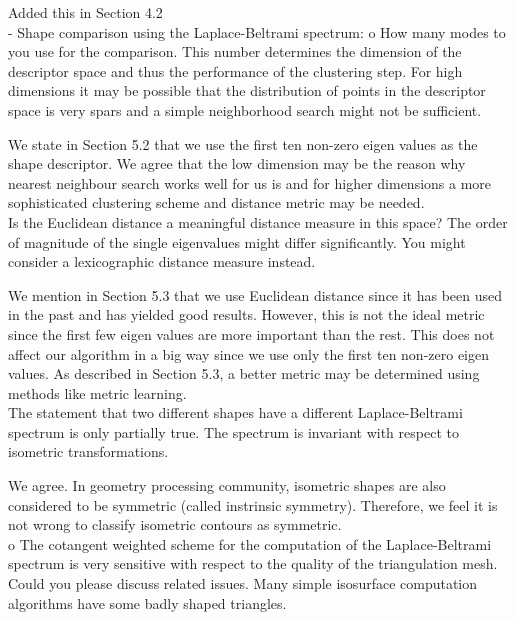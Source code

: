 \documentclass[10pt]{article}
\begin{document}
   {\color{blue}Added this in Section 4.2}\\

   - Shape comparison using the Laplace-Beltrami spectrum:
   o How many modes to you use for the comparison. This number determines
   the dimension of the descriptor space and thus the performance of the
   clustering step. For high dimensions it may be possible that the
   distribution of points in the descriptor space is very spars and a simple
   neighborhood search might not be sufficient. 

   {\color{blue}We state in Section 5.2 that we use the first ten non-zero eigen
	   values as the shape descriptor. We agree that the low dimension
	   may be the reason why
	   nearest neighbour search works well for us is 
	   and for higher dimensions a more sophisticated clustering
   scheme and distance metric may be needed.}\\

   Is the Euclidean distance a meaningful distance measure in this space?
   The order of magnitude of the single eigenvalues might differ
   significantly. You might consider a lexicographic distance measure
   instead.

   {\color{blue}We mention in Section 5.3 that we use Euclidean distance
	   since it has been used in the past and has yielded good results.
	   However, this is not the ideal metric since the first few eigen
	   values are more important than the rest. This does not affect our
	   algorithm in a big way since we use only the first ten non-zero
	   eigen values. As described in Section 5.3, a better metric may
   be determined using methods like metric learning.}\\

   The statement that two different shapes have a different
   Laplace-Beltrami spectrum is only partially true. The spectrum is
   invariant with respect to isometric transformations.  

   {\color{blue} We agree. In geometry processing community,
	   isometric shapes are also considered to be symmetric (called instrinsic symmetry).
   Therefore, we feel it is not wrong to classify isometric contours as symmetric.}\\

   o The cotangent weighted scheme for the computation of the
   Laplace-Beltrami spectrum is very sensitive with respect to the quality
   of the triangulation mesh. Could you please discuss related issues. Many
   simple isosurface computation algorithms have some badly shaped
   triangles.
\end{document}
